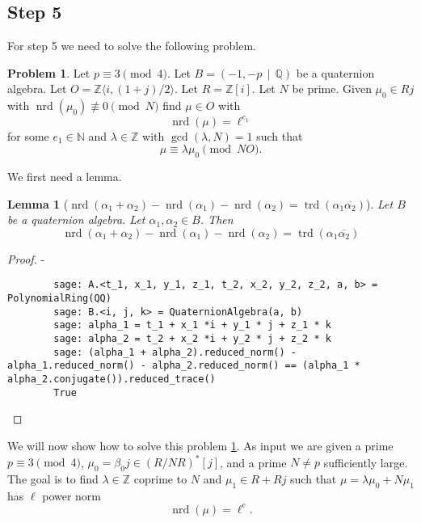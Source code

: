 \documentclass[10pt]{article}
\theoremstyle{plain}
\newtheorem{lemma}[theorem]{Lemma}
\theoremstyle{definition}
\newtheorem{prob}[theorem]{Problem}
\newcommand{\op}{\operatorname}
\newcommand{\N}{\mathbb{N}}
\newcommand{\Z}{\mathbb{Z}}
\newcommand{\Q}{\mathbb{Q}}
\newcommand{\nrd}{\op{nrd}}
\newcommand{\trd}{\op{trd}}
\begin{document}
\subsection{Step 5}
For step 5 we need to solve the following problem.

\begin{prob} \label{prob: mu = lambda * mu_0}
    Let \( p \equiv 3 \pmod{4} \).
    Let \( B =  (-1, -p \, \mid \, \Q) \) be a quaternion algebra.
    Let \( O = \Z \langle i, (1+j) / 2 \rangle \).
    Let \( R = \Z[i] \).
    Let \( N \) be prime.
    Given \( \mu_0 \in Rj \) with \( \nrd(\mu_0) \not\equiv 0 \pmod{N} \) find \( \mu \in O \) with
    \[
        \nrd(\mu) = \ell^{e_1}
    \]
    for some \( e_1 \in \N \) and \(\lambda \in \Z \) with \( \gcd(\lambda, N) = 1 \) such that
    \[
        \mu \equiv \lambda \mu_0 \pmod{NO}.
    \]
\end{prob}

We first need a lemma.
\begin{lemma}[\( \nrd(\alpha_1 + \alpha_2) - \nrd(\alpha_1) - \nrd(\alpha_2) = \trd(\alpha_1 \overline{\alpha_2}) \)]
    Let \( B \) be a quaternion algebra.
    Let \( \alpha_1, \alpha_2 \in B \).
    Then
    \[
        \nrd(\alpha_1 + \alpha_2) - \nrd(\alpha_1) - \nrd(\alpha_2)
        = \trd(\alpha_1 \overline{\alpha_2})
    \]
\end{lemma}
\begin{proof}
    -
    \begin{lstlisting}
        sage: A.<t_1, x_1, y_1, z_1, t_2, x_2, y_2, z_2, a, b> = PolynomialRing(QQ)
        sage: B.<i, j, k> = QuaternionAlgebra(a, b)
        sage: alpha_1 = t_1 + x_1 *i + y_1 * j + z_1 * k
        sage: alpha_2 = t_2 + x_2 *i + y_2 * j + z_2 * k
        sage: (alpha_1 + alpha_2).reduced_norm() - alpha_1.reduced_norm() - alpha_2.reduced_norm() == (alpha_1 * alpha_2.conjugate()).reduced_trace()
        True
    \end{lstlisting}
\end{proof}


We will now show how to solve this problem \ref{prob: mu = lambda * mu_0}.
As input we are given a prime \( p \equiv 3 \pmod{4} \), \( \mu_0 = \beta_0j \in (R / NR)^*[j] \), and a prime \( N \neq p \) sufficiently large.
The goal is to find \( \lambda \in \Z \) coprime to \( N \) and \( \mu_1 \in  R + Rj \) such that \( \mu = \lambda \mu_0 + N \mu_1 \) has \( \ell \) power norm
\[
    \nrd(\mu) = \ell^e.
\]
\end{document}
